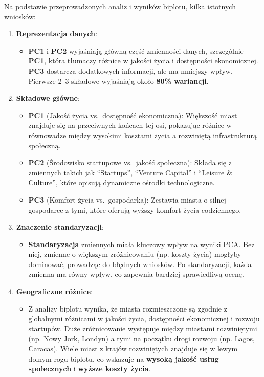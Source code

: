 \documentclass[
  12pt,
]{article}
\providecommand{\tightlist}{%
  \setlength{\itemsep}{0pt}\setlength{\parskip}{0pt}}
\begin{document}
Na podstawie przeprowadzonych analiz i wyników biplotu, kilka istotnych
wniosków:

\begin{enumerate}
\def\labelenumi{\arabic{enumi}.}
\tightlist
\item
  \textbf{Reprezentacja danych}:

  \begin{itemize}
  \tightlist
  \item
    \textbf{PC1} i \textbf{PC2} wyjaśniają główną część zmienności
    danych, szczególnie \textbf{PC1}, która tłumaczy różnice w jakości
    życia i dostępności ekonomicznej. \textbf{PC3} dostarcza dodatkowych
    informacji, ale ma mniejszy wpływ. Pierwsze 2--3 składowe wyjaśniają
    około \textbf{80\% wariancji}.
  \end{itemize}
\item
  \textbf{Składowe główne}:

  \begin{itemize}
  \tightlist
  \item
    \textbf{PC1} (Jakość życia vs.~dostępność ekonomiczna): Większość
    miast znajduje się na przeciwnych końcach tej osi, pokazując różnice
    w równowadze między wysokimi kosztami życia a rozwiniętą
    infrastrukturą społeczną.
  \item
    \textbf{PC2} (Środowisko startupowe vs.~jakość społeczna): Składa
    się z zmiennych takich jak ``Startups'', ``Venture Capital'' i
    ``Leisure \& Culture'', które opisują dynamiczne ośrodki
    technologiczne.
  \item
    \textbf{PC3} (Komfort życia vs.~gospodarka): Zestawia miasta o
    silnej gospodarce z tymi, które oferują wyższy komfort życia
    codziennego.
  \end{itemize}
\item
  \textbf{Znaczenie standaryzacji}:

  \begin{itemize}
  \tightlist
  \item
    \textbf{Standaryzacja} zmiennych miała kluczowy wpływ na wyniki PCA.
    Bez niej, zmienne o większym zróżnicowaniu (np. koszty życia)
    mogłyby dominować, prowadząc do błędnych wniosków. Po standaryzacji,
    każda zmienna ma równy wpływ, co zapewnia bardziej sprawiedliwą
    ocenę.
  \end{itemize}
\item
  \textbf{Geograficzne różnice}:

  \begin{itemize}
  \tightlist
  \item
    Z analizy biplotu wynika, że miasta rozmieszczone są zgodnie z
    globalnymi różnicami w jakości życia, dostępności ekonomicznej i
    rozwoju startupów. Duże zróżnicowanie występuje między miastami
    rozwiniętymi (np. Nowy Jork, Londyn) a tymi na początku drogi
    rozwoju (np. Lagos, Caracas). Wiele miast z krajów rozwiniętych
    znajduje się w lewym dolnym rogu biplotu, co wskazuje na
    \textbf{wysoką jakość usług społecznych} i \textbf{wyższe koszty
    życia}.
  \end{itemize}
\end{enumerate}
\end{document}
